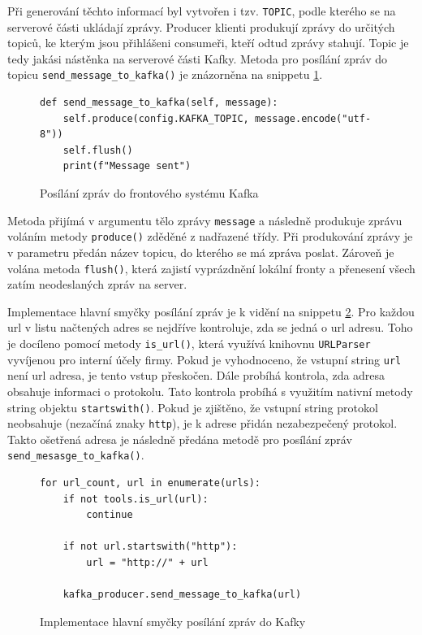 \documentclass[thesis=M,czech,hidelinks]{FITthesis}[2013/05/06]
\begin{document}
Při generování těchto informací byl vytvořen i tzv. \texttt{TOPIC}, podle kterého se na serverové části ukládají zprávy. Producer klienti produkují zprávy do určitých topiců, ke kterým jsou přihlášeni consumeři, kteří odtud zprávy stahují. Topic je tedy jakási nástěnka na serverové části Kafky. Metoda pro posílání zpráv do topicu \texttt{send_message_to_kafka()} je znázorněna na snippetu \ref{snip:kafkasend}.
\begin{figure}[h]               
	\begin{verbatim}
def send_message_to_kafka(self, message):
    self.produce(config.KAFKA_TOPIC, message.encode("utf-8"))
    self.flush()
    print(f"Message sent")
	\end{verbatim}      
	\caption{Posílání zpráv do frontového systému Kafka}
	\label{snip:kafkasend}
\end{figure}
Metoda přijímá v argumentu tělo zprávy \texttt{message} a následně produkuje zprávu voláním metody \texttt{produce()} zděděné z nadřazené třídy. Při produkování zprávy je v parametru předán název topicu, do kterého se má zpráva poslat. Zároveň je volána metoda \texttt{flush()}, která zajistí vyprázdnění lokální fronty a přenesení všech zatím neodeslaných zpráv na server.

Implementace hlavní smyčky posílání zpráv je k vidění na snippetu \ref{snip:kafkasendmain}. Pro každou url v listu načtených adres se nejdříve kontroluje, zda se jedná o url adresu. Toho je docíleno pomocí metody \texttt{is_url()}, která využívá knihovnu \texttt{URLParser} vyvíjenou pro interní účely firmy. Pokud je vyhodnoceno, že vstupní string \texttt{url} není url adresa, je tento vstup přeskočen. Dále probíhá kontrola, zda adresa obsahuje informaci o protokolu. Tato kontrola probíhá s využitím nativní metody string objektu \texttt{startswith()}. Pokud je zjištěno, že vstupní string protokol neobsahuje (nezačíná znaky \texttt{http}), je k adrese přidán nezabezpečený protokol. Takto ošetřená adresa je následně předána metodě pro posílání zpráv \texttt{send_mesasge_to_kafka()}.
\begin{figure}[h]               
	\begin{verbatim}
for url_count, url in enumerate(urls):
    if not tools.is_url(url):
        continue

    if not url.startswith("http"):
        url = "http://" + url

    kafka_producer.send_message_to_kafka(url)
	\end{verbatim}      
	\caption{Implementace hlavní smyčky posílání zpráv do Kafky}
	\label{snip:kafkasendmain}
\end{figure}
\end{document}
